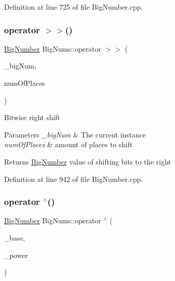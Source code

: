 Definition at line 725 of file Big\+Number.\+cpp.

\mbox{\label{namespace_big_nums_a461540d97b6da48dc4f771ab6c41a5f9}} 
\subsubsection{\texorpdfstring{operator $>$$>$()}{operator >>()}\hspace{0.1cm}{\footnotesize\ttfamily [2/2]}}
{\footnotesize\ttfamily \mbox{\hyperlink{class_big_nums_1_1_big_number}{Big\+Number}} Big\+Nums\+::operator $>$$>$ (\begin{DoxyParamCaption}\item[{const \mbox{\hyperlink{class_big_nums_1_1_big_number}{Big\+Number}} \&}]{\+\_\+big\+Num,  }\item[{int}]{num\+Of\+Places }\end{DoxyParamCaption})}

Bitwise right shift 
\begin{DoxyParams}{Parameters}
{\em \+\_\+big\+Num} & The current instance \\
\hline
{\em num\+Of\+Places} & amount of places to shift \\
\hline
\end{DoxyParams}
\begin{DoxyReturn}{Returns}
\mbox{\hyperlink{class_big_nums_1_1_big_number}{Big\+Number}} value of shifting bits to the right 
\end{DoxyReturn}


Definition at line 942 of file Big\+Number.\+cpp.

\mbox{\label{namespace_big_nums_a26f4f7080ee4ac682138c92ad0ce7f75}} 
\subsubsection{\texorpdfstring{operator $^\wedge$()}{operator ^()}\hspace{0.1cm}{\footnotesize\ttfamily [1/2]}}
{\footnotesize\ttfamily \mbox{\hyperlink{class_big_nums_1_1_big_number}{Big\+Number}} Big\+Nums\+::operator $^\wedge$ (\begin{DoxyParamCaption}\item[{\mbox{\hyperlink{class_big_nums_1_1_big_number}{Big\+Number}}}]{\+\_\+base,  }\item[{int}]{\+\_\+power }\end{DoxyParamCaption})}

